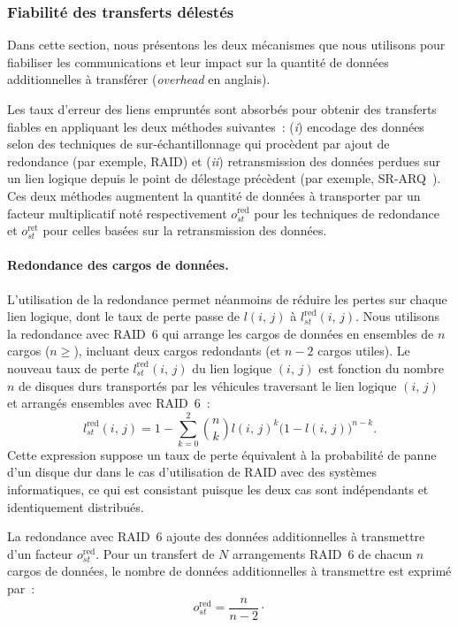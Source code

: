  
\subsubsection{Fiabilité des transferts délestés} 
\label{sec:fiabilite-fr} 
 
 
Dans cette section, nous présentons les deux mécanismes que nous utilisons pour fiabiliser les communications et leur impact sur la quantité de données additionnelles à transférer (\textit{overhead} en anglais). 
 
 
Les taux d’erreur des liens empruntés sont absorbés pour obtenir des transferts fiables en appliquant les deux méthodes suivantes~: (\textit{i}) encodage des données selon des techniques de sur-échantillonnage qui procèdent par ajout de redondance (par exemple, RAID) et (\textit{ii}) retransmission des données perdues sur un lien logique depuis le point de délestage précèdent (par exemple, SR-ARQ~\cite{costello2004error}). Ces deux méthodes augmentent la quantité de données à transporter par un facteur multiplicatif noté respectivement $o_{st}^{\text{red}}$ pour les techniques de redondance et  $o_{st}^{\text{ret}}$ pour celles basées sur la retransmission des données.  
 
 
\paragraph{Redondance des cargos de données.} 
L’utilisation de la redondance permet néanmoins de réduire les pertes sur chaque lien logique, dont le taux de perte passe de $l(i,\,j)$ à $l^{\text{red}}_{st}(i,\,j)$. Nous utilisons la redondance avec RAID~6 qui arrange les cargos de données en ensembles de $n$ cargos ($n\geq$), incluant deux cargos redondants (et $n-2$ cargos utiles). Le nouveau taux de perte $l^{\text{red}}_{st}(i,\,j)$ du lien logique $(i,\,j)$ est fonction du nombre $n$ de disques durs transportés par les véhicules traversant le lien logique $(i,\,j)$ et arrangés ensembles avec RAID~6~: 
\begin{equation} 
l^{\text{red}}_{st}(i,\,j) = 1 - \sum_{k=0}^{2} \binom{n}{k} l(i,\,j)^{k}\big(1-l(i,\,j)\big)^{n-k}. 
\end{equation} 
\noindent Cette expression suppose un taux de perte équivalent à la probabilité de panne d’un disque dur dans le cas d’utilisation de RAID avec des systèmes informatiques, ce qui est consistant puisque les deux cas sont indépendants et identiquement distribués. 
 
 
La redondance avec RAID~6 ajoute des données additionnelles à transmettre d’un facteur $o_{st}^{\text{red}}$. Pour un transfert de $N$ arrangements RAID~6 de chacun $n$ cargos de données, le nombre de données additionnelles à transmettre est exprimé par~: 
\begin{equation} 
o_{st}^{\text{red}} = \frac{n}{n-2}\cdot 
    \label{eq:redundancy-fr} 
\end{equation} 
 

